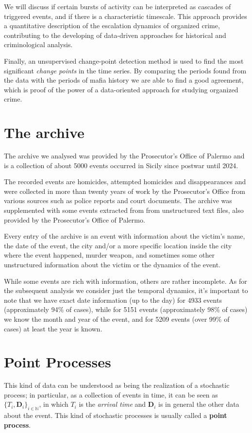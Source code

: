\documentclass[11pt]{article}
\begin{document}
We will discuss if certain bursts of activity can be interpreted as cascades of triggered events, and if there is a characteristic timescale. This approach provides a quantitative description of the escalation dynamics of organized crime, contributing to the developing of data-driven approaches for historical and criminological analysis.

Finally, an unsupervised change-point detection method is used to find the most significant \textit{change points} in the time series. By comparing the periods found from the data with the periods of mafia history we are able to find a good agreement, which is proof of the power of a data-oriented approach for studying organized crime.

\section{The archive}
The archive we analysed was provided by the Prosecutor's Office of Palermo and is a collection of about 5000 events occurred in Sicily since postwar until 2024.

The recorded events are homicides, attempted homicides and disappearances and were collected in more than twenty years of work by the Prosecutor's Office from various sources such as police reports and court documents. The archive was supplemented with some events extracted from  from unstructured text files, also provided by the Prosecutor's Office of Palermo.

Every entry of the archive is an event with information about the victim's name, the date of the event, the city and/or a more specific location inside the city where the event happened, murder weapon, and sometimes some other unstructured information about the victim or the dynamics of the event.

While some events are rich with information, others are rather incomplete. As for the subsequent analysis we consider just the temporal dynamics, it's important to note that we have exact date information (up to the day) for 4933 events (approximately 94\% of cases), while for 5151 events (approximately 98\% of cases) we know the month and year of the event, and for 5209 events (over 99\% of cases) at least the year is known.



\section{Point Processes}
This kind of data can be understood as being the realization of a stochastic process; in particular, as a collection of events in time, it can be seen as $\{T_i, \mathbf{D}_i\}_{i \in \mathbb{N}}$, in which $T_i$ is the \textit{arrival time} and $\mathbf{D}_i$ is in general the other data about the event. This kind of stochastic processes is usually called a \textbf{point process}.
\end{document}
